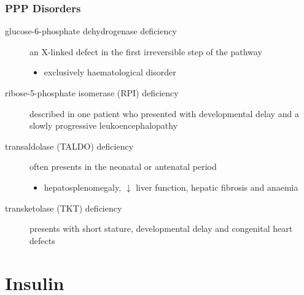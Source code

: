 \documentclass{scrartcl}
\begin{document}
\subsubsection{PPP Disorders}
\label{sec:org71700a2}
\begin{description}
\item[{glucose-6-phosphate dehydrogenase deficiency}] an X-linked defect
in the first irreversible step of the pathway
\begin{itemize}
\item exclusively haematological disorder
\end{itemize}
\item[{ribose-5-phosphate isomerase (RPI) deficiency}] described in one
patient who presented with developmental delay and a slowly
progressive leukoencephalopathy
\item[{transaldolase (TALDO) deficiency}] often presents in the neonatal
or antenatal period
\begin{itemize}
\item hepatosplenomegaly, \(\downarrow\) liver function, hepatic fibrosis
and anaemia
\end{itemize}
\item[{transketolase (TKT) deficiency}] presents with short stature,
developmental delay and congenital heart defects
\end{description}
\section{Insulin}
\label{sec:orga99ecfd}
\end{document}
